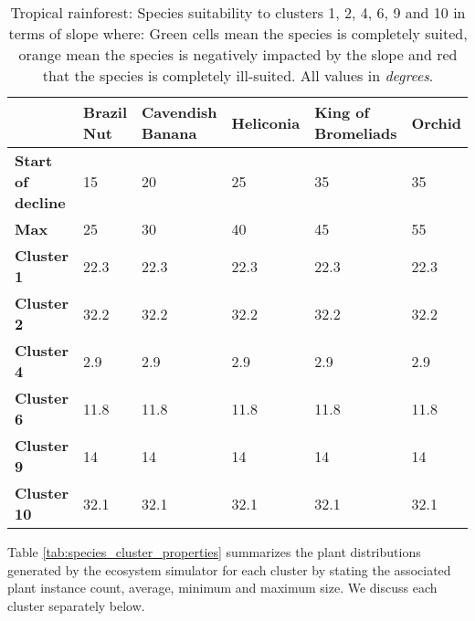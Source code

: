 \begin{table}[h]
  \centering
	    \begin{tabular}{|p{2cm}|p{2.5cm}|p{2.5cm}|p{2.5cm}|p{2.5cm}|p{2.5cm}|}
		\hline	
  	     & \textbf{Brazil Nut} & \textbf{Cavendish Banana} & \textbf{Heliconia} & \textbf{King of Bromeliads} & \textbf{Orchid} \\
  	    \hline	
		\textbf{Start of decline} & 
		15 & 
		20 & 
		25 &
		35 & 
		35 \\
		\hline
		\textbf{Max} & 
		25 &
		30 &
		40 &
		45 & 
		55 \\
		\hline
		\textbf{Cluster 1} & 
		\cellcolor{color_orange}22.3 &
		\cellcolor{color_orange}22.3 &
		\cellcolor{color_green}22.3 &
		\cellcolor{color_green}22.3 &
		\cellcolor{color_green}22.3 \\
		\hline
		\textbf{Cluster 2} & 
		\cellcolor{color_red}32.2 &
		\cellcolor{color_red}32.2 &
		\cellcolor{color_orange}32.2 &
		\cellcolor{color_green}32.2 &
		\cellcolor{color_green}32.2 \\
		\hline
		\textbf{Cluster 4} & 
		\cellcolor{color_green}2.9 & 
		\cellcolor{color_green}2.9 &
		\cellcolor{color_green}2.9 &
		\cellcolor{color_green}2.9 &
		\cellcolor{color_green}2.9 \\
		\hline
		\textbf{Cluster 6} & 
		\cellcolor{color_green}11.8 & 
		\cellcolor{color_green}11.8 &
		\cellcolor{color_green}11.8 &
		\cellcolor{color_green}11.8 &
		\cellcolor{color_green}11.8 \\
		\hline
		\textbf{Cluster 9} & 
		\cellcolor{color_green}14 & 
		\cellcolor{color_green}14 &
		\cellcolor{color_green}14 &
		\cellcolor{color_green}14 &
		\cellcolor{color_green}14 \\
		\hline
		\textbf{Cluster 10} & 
		\cellcolor{color_red}32.1 & 
		\cellcolor{color_red}32.1 &
		\cellcolor{color_orange}32.1 &
		\cellcolor{color_green}32.1 &
		\cellcolor{color_green}32.1 \\
		\hline
		\end{tabular}
		\caption{Tropical rainforest: Species suitability to clusters 1, 2, 4, 6, 9 and 10 in terms of slope where: Green cells mean the species is completely suited, orange mean the species is negatively impacted by the slope and red that the species is completely ill-suited. All values in \textit{degrees}.}
	  \label{tab:results_tropical_species_slope_suitability}
\end{table}

Table \ref{tab:species_cluster_properties} summarizes the plant distributions generated by the ecosystem simulator for each cluster by stating the associated plant instance count, average, minimum and maximum size. We discuss each cluster separately below. \\

